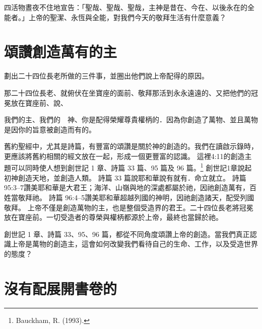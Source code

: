 \begin{ReaderQuestion}
四活物晝夜不住地宣告：「聖哉、聖哉、聖哉，主神是昔在、今在、以後永在的全能者。」上帝的聖潔、永恆與全能，對我們今天的敬拜生活有什麼意義？
\end{ReaderQuestion}

\section{頌讚創造萬有的主}

\begin{ScriptureBox2}{劃出二十四位長老所做的三件事，並圈出他們說上帝配得的原因。}

\item[4:10] 那二十四位長老、就俯伏在坐寶座的面前、敬拜那活到永永遠遠的、又把他們的冠冕放在寶座前、說、

\item[4:11] 我們的主、我們的　神、你是配得榮耀尊貴權柄的．因為你創造了萬物、並且萬物是因你的旨意被創造而有的。

\end{ScriptureBox2}

舊約聖經中，尤其是詩篇，有豐富的頌讚是關於神的創造的。我們在讀啟示錄時，更應該將舊約相關的經文放在一起，形成一個更豐富的認識。
這裡4:11的創造主題可以同時使人想到創世記 1 章、詩篇 33 篇、95 篇及 96 篇。\footnote{Bauckham, R. (1993).}
創世記1章說起初神創造天地，並創造人類。 
詩篇 33 篇說耶和華說有就有．命立就立。
詩篇 95:3–7讚美耶和華是大君王；海洋、山嶺與地的深處都屬於祂，因祂創造萬有，百姓當敬拜祂。
詩篇 96:4–5讚美耶和華超越列國的神明，因祂創造諸天，配受列國敬拜。
上帝不僅是創造萬物的主，也是整個受造界的君王。二十四位長老將冠冕放在寶座前。一切受造者的尊榮與權柄都源於上帝，最終也當歸於祂。

\begin{ReaderQuestion}
創世記 1 章、詩篇 33、95、96 篇，都從不同角度頌讚上帝的創造。當我們真正認識上帝是萬物的創造主，這會如何改變我們看待自己的生命、工作，以及受造世界的態度？
\end{ReaderQuestion}

\section{沒有配展開書卷的}

